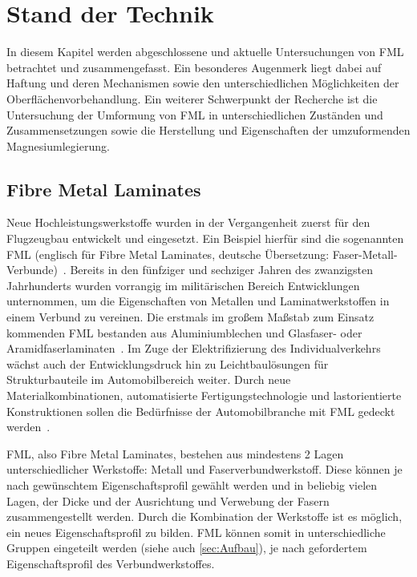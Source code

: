 \chapter{Stand der Technik}\label{cha:Stand}

In diesem Kapitel werden abgeschlossene und aktuelle Untersuchungen von FML betrachtet und zusammengefasst.
Ein besonderes Augenmerk liegt dabei auf Haftung und deren Mechanismen sowie den unterschiedlichen Möglichkeiten der Oberflächenvorbehandlung.
Ein weiterer Schwerpunkt der Recherche ist die Untersuchung der Umformung von FML in unterschiedlichen Zuständen und Zusammensetzungen sowie die Herstellung und Eigenschaften der umzuformenden Magnesiumlegierung.

\section{Fibre Metal Laminates}\label{sec:FML}

Neue Hochleistungswerkstoffe wurden in der Vergangenheit zuerst für den Flugzeugbau entwickelt und eingesetzt.
Ein Beispiel hierfür sind die sogenannten FML (englisch für Fibre Metal Laminates, deutsche Übersetzung: Faser-Metall-Verbunde)~.
Bereits in den fünfziger und sechziger Jahren des zwanzigsten Jahrhunderts wurden vorrangig im militärischen Bereich Entwicklungen unternommen, um die Eigenschaften von Metallen und Laminatwerkstoffen in einem Verbund zu vereinen.
Die erstmals im großem Maßstab zum Einsatz kommenden FML bestanden aus Aluminiumblechen und Glasfaser- oder Aramidfaserlaminaten~\cite{Vogelesang.2000}.
Im Zuge der Elektrifizierung des Individualverkehrs wächst auch der Entwicklungsdruck hin zu Leichtbaulösungen für Strukturbauteile im Automobilbereich weiter.
Durch neue Materialkombinationen, automatisierte Fertigungstechnologie und lastorientierte Konstruktionen sollen die Bedürfnisse der Automobilbranche mit FML gedeckt werden~\cite{Wollmann.2018}.

FML, also Fibre Metal Laminates, bestehen aus mindestens 2 Lagen unterschiedlicher Werkstoffe: Metall und Faserverbundwerkstoff. Diese können je nach gewünschtem Eigenschaftsprofil gewählt werden und in beliebig vielen Lagen, der Dicke und der Ausrichtung und Verwebung der Fasern zusammengestellt werden. Durch die Kombination der Werkstoffe ist es möglich, ein neues Eigenschaftsprofil zu bilden. FML können somit in unterschiedliche Gruppen eingeteilt werden (siehe auch \autoref{sec:Aufbau}), je nach gefordertem Eigenschaftsprofil des Verbundwerkstoffes. 

